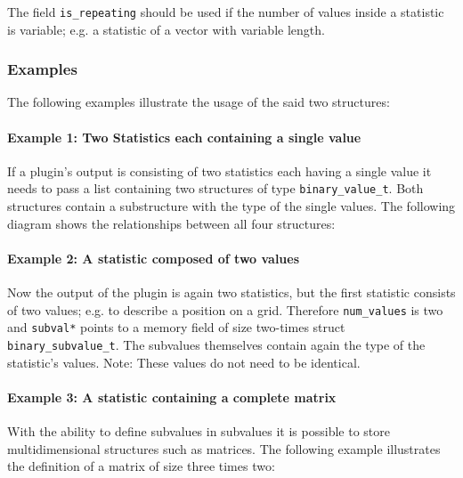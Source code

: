 \documentclass[documentation]{subfiles}
\begin{document}
The field {\tt is\_repeating} should be used if the number of values inside a statistic is variable; e.g. a statistic of a vector with variable length.

\subsubsection{Examples}
The following examples illustrate the usage of the said two structures:

\paragraph{Example 1: Two Statistics each containing a single value}
If a plugin's output is consisting of two statistics each having a single value it needs to pass a list containing two structures of type {\tt binary\_value\_t}. Both structures contain a substructure with the type of the single values. The following diagram shows the relationships between all four structures:
\begin{figure}[H]
    \centering
\end{figure}

\paragraph{Example 2: A statistic composed of two values}
Now the output of the plugin is again two statistics, but the first statistic consists of two values; e.g. to describe a position on a grid. Therefore {\tt num\_values} is two and {\tt subval*} points to a memory field of size two-times struct {\tt binary\_subvalue\_t}. The subvalues themselves contain again the type of the statistic's values. Note: These values do not need to be identical.
\begin{figure}[H]
    \centering
\end{figure}

\paragraph{Example 3: A statistic containing a complete matrix}
With the ability to define subvalues in subvalues it is possible to store multidimensional structures such as matrices. The following example illustrates the definition of a matrix of size three times two:
\begin{figure}[H]
    \centering
\end{figure}
\end{document}
